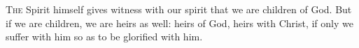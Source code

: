\lettrine[lines=3,loversize=0.15]{T}{he} Spirit himself gives witness with our spirit that we are children of God. But if we are children, we are heirs as well: heirs of God, heirs with Christ, if only we suffer with him so as to be glorified with him.
